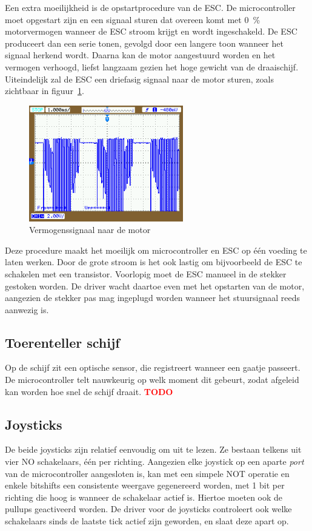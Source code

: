 \documentclass[12pt]{ugentreport}
\newcommand{\TODO}[1]{\textcolor{red}{\large\textbf{TODO}}\todo{#1}}
\begin{document}
Een extra moeilijkheid is de opstartprocedure van de ESC.
De microcontroller moet opgestart zijn en een signaal sturen dat overeen komt
met \SI{0}{\percent} motorvermogen wanneer de ESC stroom krijgt en wordt
ingeschakeld. De ESC produceert dan een serie tonen, gevolgd door een langere
toon wanneer het signaal herkend wordt. Daarna kan de motor aangestuurd worden
en het vermogen verhoogd, liefst langzaam gezien het hoge gewicht van de draaischijf.
Uiteindelijk zal de ESC een driefasig signaal naar de motor sturen, zoals
zichtbaar in figuur~\ref{fig:motoresc}.

\begin{figure}
  \centering
  \includegraphics[width=0.6\textwidth]{img/scoopesc.png}
  \caption{Vermogenssignaal naar de motor}
  \label{fig:motoresc}
\end{figure}


Deze procedure maakt het moeilijk om microcontroller en ESC op één voeding te
laten werken. Door de grote stroom is het ook lastig om bijvoorbeeld de ESC te
schakelen met een transistor. Voorlopig moet de ESC manueel in de stekker
gestoken worden. De driver wacht daartoe even met het opstarten van de motor,
aangezien de stekker pas mag ingeplugd worden wanneer het stuursignaal reeds
aanwezig is.

\subsection{Toerenteller schijf}
Op de schijf zit een optische sensor, die registreert wanneer een gaatje
passeert. De microcontroller telt nauwkeurig op welk moment dit gebeurt,
zodat afgeleid kan worden hoe snel de schijf draait.
\TODO{Info toerenteller}

\subsection{Joysticks}
De beide joysticks zijn relatief eenvoudig om uit te lezen.
Ze bestaan telkens uit vier NO schakelaars, één per richting.
Aangezien elke joystick op een aparte \emph{port} van de microcontroller
aangesloten is, kan met een simpele NOT operatie en enkele bitshifts een
consistente weergave gegenereerd worden, met 1 bit per richting die hoog is
wanneer de schakelaar actief is. Hiertoe moeten ook de pullups geactiveerd
worden. De driver voor de joysticks controleert ook welke schakelaars sinds de
laatste tick actief zijn geworden, en slaat deze apart op.
\end{document}
